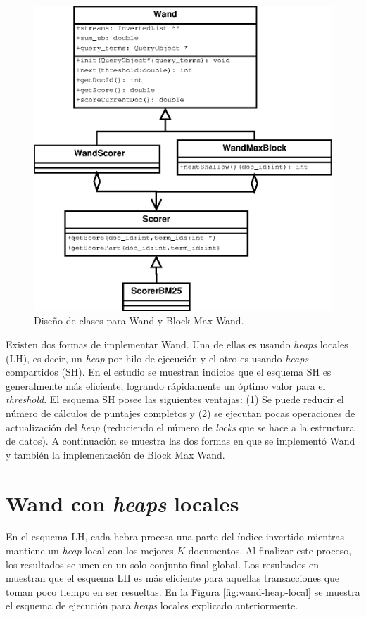 \begin{figure}[tp]
\centering
\includegraphics[scale=.75]{images/WAND.eps}
\caption{Diseño de clases para Wand y Block Max Wand.}
\label{fig:diagramawand}
\end{figure}

Existen dos formas de implementar Wand. Una de ellas es usando \textit{heaps} locales (LH), es decir, un \textit{heap} por hilo de ejecución y el otro es usando \textit{heaps} compartidos (SH). En el estudio \citep{Rojas:2013} se muestran indicios que el esquema SH es generalmente más eficiente, logrando rápidamente un óptimo valor para el \textit{threshold}. El esquema SH posee las siguientes ventajas: (1) Se puede reducir el número de cálculos de puntajes completos y (2) se ejecutan pocas operaciones de actualización del \textit{heap} (reduciendo el número de \textit{locks} que se hace a la estructura de datos). 
A continuación se muestra las dos formas en que se implementó Wand y también la implementación de Block Max Wand.


\section{Wand con \textit{heaps} locales}
\label{scheduling:wlh}
En el esquema LH, cada hebra procesa una parte del índice invertido mientras mantiene un \textit{heap} local con los mejores $K$ documentos. Al finalizar este proceso, los resultados se unen en un solo conjunto final global. Los resultados en \citep{Rojas:2013} muestran que el esquema LH es más eficiente para aquellas transacciones que toman poco tiempo en ser resueltas. En la Figura \ref{fig:wand-heap-local} se muestra el esquema de ejecución para \textit{heaps} locales explicado anteriormente. 


